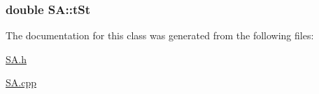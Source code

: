 \subsubsection[{t\+St}]{\setlength{\rightskip}{0pt plus 5cm}double S\+A\+::t\+St\hspace{0.3cm}{\ttfamily [private]}}\label{classSA_a5566e85c234f471529ca562d60df248e}


The documentation for this class was generated from the following files\+:\begin{DoxyCompactItemize}
\item 
\hyperlink{SA_8h}{S\+A.\+h}\item 
\hyperlink{SA_8cpp}{S\+A.\+cpp}\end{DoxyCompactItemize}
